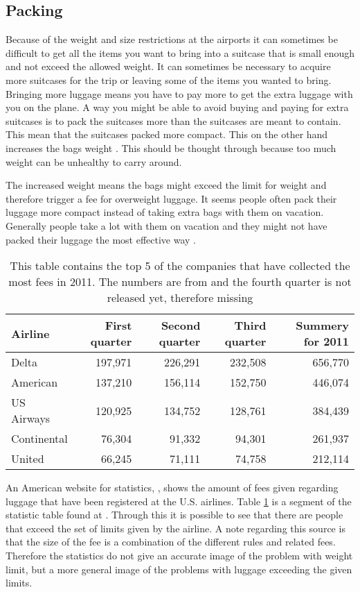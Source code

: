 \subsection*{Packing}

Because of the weight and size restrictions at the airports it can sometimes be difficult to get all the items you want to bring into a suitcase that is small enough and not exceed the allowed weight. It can sometimes be necessary to acquire more suitcases for the trip or leaving some of the items you wanted to bring. 
Bringing more luggage means you have to pay more to get the extra luggage with you on the plane. A way you might be able to avoid buying and paying for extra suitcases is to pack the suitcases more than the suitcases are meant to contain. This mean that the suitcases packed more compact. This on the other hand increases the bags weight \citep{altombag}. This should be thought through because too much weight can be unhealthy to carry around.

The increased weight means the bags might exceed the limit for weight and therefore trigger a fee for overweight luggage.
It seems people often pack their luggage more compact instead of taking extra bags with them on vacation. Generally people take a lot with them on vacation and they might not have packed their luggage the most effective way \citep{airstat}.

\begin{table}[H]
\begin{tabular}{| l | r | r | r | r |}
\hline
Airline &  First quarter & Second quarter & Third quarter & Summery for 2011 \\ \hline
Delta & 197,971 & 226,291 & 232,508 & 656,770 \\ \hline
American & 137,210 & 156,114 & 152,750 & 446,074 \\ \hline
US Airways & 120,925 & 134,752 & 128,761 & 384,439 \\ \hline
Continental & 76,304 & 91,332 & 94,301 & 261,937\\ \hline
United & 66,245 & 71,111 & 74,758 & 212,114 \\ \hline
\end{tabular}
\caption{This table contains the top 5 of the companies that have collected the most fees in 2011. The numbers are from \citep{airstat} and the fourth quarter is not released yet, therefore missing}
\label{tab:airlinefees}
\end{table}

An American website for statistics, \citep{airstat}, shows the amount of fees given regarding luggage that have been registered at the U.S. airlines. Table \ref{tab:airlinefees} is a segment of the statistic table found at \citep{airstat}. Through this it is possible to see that there are people that exceed the set of limits given by the airline. A note regarding this source is that the size of the fee is a combination of the different rules and related fees. Therefore the statistics do not give an accurate image of the problem with weight limit, but a more general image of the problems with luggage exceeding the given limits.

